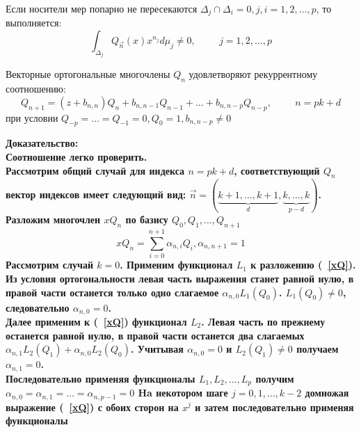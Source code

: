 \begin{prope} Если носители мер попарно не пересекаются
$\Delta_j\cap\Delta_i=0, j,i=1,2,\ldots,p$, то выполняется:
\begin{equation}
\label{Ortogonality} \int_{\Delta_j}{Q_{\overrightarrow{n}}(x)}
x^{n_j}d\mu_j \not=0, \hspace{1cm}j=1,2,\ldots,p
\end{equation}
\end{prope}
\begin{prope}
Векторные ортогональные многочлены $Q_n$ удовлетворяют
рекуррентному соотношению:
\begin{equation}
\label{QRecurrrence}
Q_{n+1}=(z+b_{n,n})Q_n+b_{n,n-1}Q_{n-1}+\ldots+b_{n,n-p}Q_{n-p},
\hspace{1cm} n=pk+d
\end{equation}
при условии $Q_{-p}=\ldots=Q_{-1}=0,Q_0=1, b_{n,n-p}\not=0$ \\
\end{prope}
\bf Доказательство: \rm \\
Соотношение легко проверить. \\ Рассмотрим общий случай для
индекса $n=pk+d$, соответствующий $Q_n$ вектор индексов имеет
следующий вид:
$\overrightarrow{n}=(\underbrace{k+1,\ldots,k+1}_{d},\underbrace{k,\ldots,k}_{p-d})$.
\\ Разложим многочлен $xQ_n$ по базису $Q_0,Q_1,\ldots,Q_{n+1}$
\begin{equation}
\label{xQ}
xQ_n=\sum\limits_{i=0}^{n+1}{\alpha_{n,i}Q_i},\mbox{
}\alpha_{n,n+1}=1
\end{equation}
Рассмотрим случай $k=0$. Применим функционал $L_1$ к разложению
(~\ref{xQ}). Из условия ортогональности левая часть выражения
станет равной нулю, в правой части останется только одно
слагаемое $\alpha_{n,0}L_1(Q_0)$.
$L_1(Q_0)\not=0$, следовательно $\alpha_{n,0}=0$. \\
Далее применим к (~\ref{xQ}) функционал $L_2$. Левая часть по
прежнему останется равной нулю, в правой части останется два
слагаемых $\alpha_{n,1}L_2(Q_1)+\alpha_{n,0}L_2(Q_0)$.
Учитывая $\alpha_{n,0}=0$ и $L_2(Q_1)\not=0$ получаем $\alpha_{n,1}=0$. \\
Последовательно применяя функционалы $L_1,L_2,\ldots,L_p$ получим
$\alpha_{n,0}=\alpha_{n,1}=\ldots=\alpha_{n,p-1}=0$ Ha некотором
шаге $j=0,1,\ldots,k-2$ домножая выражение (~\ref{xQ}) с обоих
сторон на $x^j$ и затем последовательно применяя функционалы

